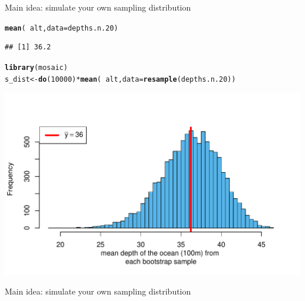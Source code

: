 \documentclass{beamer}\usepackage[]{graphicx}\usepackage[]{color}
\newcommand{\hlnum}[1]{\textcolor[rgb]{0.686,0.059,0.569}{#1}}%
\newcommand{\hlopt}[1]{\textcolor[rgb]{0,0,0}{#1}}%
\newcommand{\hlstd}[1]{\textcolor[rgb]{0.345,0.345,0.345}{#1}}%
\newcommand{\hlkwb}[1]{\textcolor[rgb]{0.69,0.353,0.396}{#1}}%
\newcommand{\hlkwc}[1]{\textcolor[rgb]{0.333,0.667,0.333}{#1}}%
\newcommand{\hlkwd}[1]{\textcolor[rgb]{0.737,0.353,0.396}{\textbf{#1}}}%
\newenvironment{knitrout}{}{} %
\begin{document}
\begin{frame}[fragile]{Main idea: simulate your own sampling distribution}



\begin{knitrout}\scriptsize
{}\color{fgcolor}
\begin{alltt}
\hlkwd{mean}\hlstd{(}\hlopt{~} \hlstd{alt,} \hlkwc{data} \hlstd{= depths.n.20)}
\end{alltt}
\begin{verbatim}
## [1] 36.2
\end{verbatim}
\begin{alltt}
\hlkwd{library}\hlstd{(mosaic)}
\hlstd{s_dist} \hlkwb{<-} \hlkwd{do}\hlstd{(}\hlnum{10000}\hlstd{)} \hlopt{*} \hlkwd{mean}\hlstd{(} \hlopt{~} \hlstd{alt,} \hlkwc{data} \hlstd{=} \hlkwd{resample}\hlstd{(depths.n.20))}
\end{alltt}


{\centering \includegraphics[width=1\linewidth]{figure/unnamed-chunk-10-1} 

}



\end{knitrout}

\end{frame}


\begin{frame}[fragile]{Main idea: simulate your own sampling distribution}



\end{frame}
\end{document}
